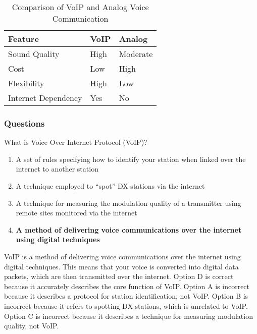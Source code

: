 \begin{table}[h]
    \centering
    \begin{tabular}{|l|l|l|}
        \hline
        \textbf{Feature} & \textbf{VoIP} & \textbf{Analog} \\
        \hline
        Sound Quality & High & Moderate \\
        Cost & Low & High \\
        Flexibility & High & Low \\
        Internet Dependency & Yes & No \\
        \hline
    \end{tabular}
    \caption{Comparison of VoIP and Analog Voice Communication}
    \label{tab:voip-comparison}
\end{table}

\subsubsection{Questions}

\begin{tcolorbox}[colback=gray!10!white,colframe=black!75!black,title={T8C07}]
    What is Voice Over Internet Protocol (VoIP)?
    \begin{enumerate}[label=\Alph*),noitemsep]
        \item A set of rules specifying how to identify your station when linked over the internet to another station
        \item A technique employed to “spot” DX stations via the internet
        \item A technique for measuring the modulation quality of a transmitter using remote sites monitored via the internet
        \item \textbf{A method of delivering voice communications over the internet using digital techniques}
    \end{enumerate}
\end{tcolorbox}

VoIP is a method of delivering voice communications over the internet using digital techniques. This means that your voice is converted into digital data packets, which are then transmitted over the internet. Option D is correct because it accurately describes the core function of VoIP. Option A is incorrect because it describes a protocol for station identification, not VoIP. Option B is incorrect because it refers to spotting DX stations, which is unrelated to VoIP. Option C is incorrect because it describes a technique for measuring modulation quality, not VoIP.
